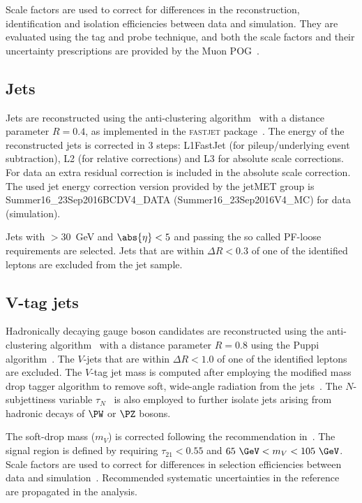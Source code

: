 Scale factors are used to correct for differences in the reconstruction, identification and isolation efficiencies between data and simulation. They are evaluated using the tag and probe technique, and both the scale factors and their uncertainty prescriptions are provided by the Muon POG~\cite{Twiki:MuonSF2016}.

\subsection{Jets}
\label{subsec:jets}
Jets are reconstructed using the anti-\kt clustering algorithm~\cite{antikt}  with a distance parameter $R=0.4$, as implemented in the \textsc{fastjet}  package~\cite{Cacciari:fastjet1,Cacciari:fastjet2}. The energy of the reconstructed jets is corrected in 3 steps: L1FastJet (for pileup/underlying event subtraction), L2 (for relative corrections) and L3 for absolute scale corrections. For data an extra residual correction is included in the absolute scale correction.
The used jet energy correction version provided by the jetMET group is Summer16\_23Sep2016BCDV4\_DATA 
(Summer16\_23Sep2016V4\_MC) for data (simulation).

Jets with \pt$>$30~GeV and $\abs{\eta}<5$ and passing the so called PF-loose requirements are selected. Jets that are within $\Delta R < 0.3$ of one of the identified leptons are excluded from the jet sample. 

\subsection{V-tag jets}
Hadronically decaying gauge boson candidates are reconstructed using the anti-\kt clustering algorithm~\cite{antikt} with a distance parameter $R=0.8$ using the Puppi algorithm~\cite{Bertolini:2014bba}. The $V$-jets that are within $\Delta R < 1.0$ of one of the identified leptons are excluded. The $V$-tag jet mass is computed after employing the modified mass drop tagger algorithm to remove soft, wide-angle radiation from the jets~\cite{Dasgupta:2013ihk,Larkoski:2014wba}. The $N$-subjettiness variable $\tau_N$~\cite{Thaler:2010tr} is also employed to further isolate jets arising from hadronic decays of $\PW$ or $\PZ$ bosons.   

The soft-drop mass ($m_{V}$) is corrected following the recommendation in~\cite{jettagging}. The signal region is defined by requiring $\tau_{21}<0.55$ and $ 65 ~\GeV < m_{V} < 105 ~\GeV$. Scale factors are used to correct for differences in selection efficiencies between data and simulation~\cite{jettagging}. Recommended systematic uncertainties in the reference~\cite{jettagging} are propagated in the analysis. 

